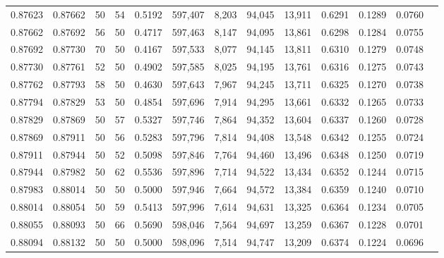 \begin{tabular}{rrrrrrrrrrrrr}
0.87623 & 0.87662 &    50 &  54 &                                     0.5192 & 597,407 &   8,203 &  94,045 &  13,911 & 0.6291 & 0.1289 & 0.0760 \\
0.87662 & 0.87692 &    56 &  50 &                                     0.4717 & 597,463 &   8,147 &  94,095 &  13,861 & 0.6298 & 0.1284 & 0.0755 \\
0.87692 & 0.87730 &    70 &  50 &                                     0.4167 & 597,533 &   8,077 &  94,145 &  13,811 & 0.6310 & 0.1279 & 0.0748 \\
0.87730 & 0.87761 &    52 &  50 &                                     0.4902 & 597,585 &   8,025 &  94,195 &  13,761 & 0.6316 & 0.1275 & 0.0743 \\
0.87762 & 0.87793 &    58 &  50 &                                     0.4630 & 597,643 &   7,967 &  94,245 &  13,711 & 0.6325 & 0.1270 & 0.0738 \\
0.87794 & 0.87829 &    53 &  50 &                                     0.4854 & 597,696 &   7,914 &  94,295 &  13,661 & 0.6332 & 0.1265 & 0.0733 \\
0.87829 & 0.87869 &    50 &  57 &                                     0.5327 & 597,746 &   7,864 &  94,352 &  13,604 & 0.6337 & 0.1260 & 0.0728 \\
0.87869 & 0.87911 &    50 &  56 &                                     0.5283 & 597,796 &   7,814 &  94,408 &  13,548 & 0.6342 & 0.1255 & 0.0724 \\
0.87911 & 0.87944 &    50 &  52 &                                     0.5098 & 597,846 &   7,764 &  94,460 &  13,496 & 0.6348 & 0.1250 & 0.0719 \\
0.87944 & 0.87982 &    50 &  62 &                                     0.5536 & 597,896 &   7,714 &  94,522 &  13,434 & 0.6352 & 0.1244 & 0.0715 \\
0.87983 & 0.88014 &    50 &  50 &                                     0.5000 & 597,946 &   7,664 &  94,572 &  13,384 & 0.6359 & 0.1240 & 0.0710 \\
0.88014 & 0.88054 &    50 &  59 &                                     0.5413 & 597,996 &   7,614 &  94,631 &  13,325 & 0.6364 & 0.1234 & 0.0705 \\
0.88055 & 0.88093 &    50 &  66 &                                     0.5690 & 598,046 &   7,564 &  94,697 &  13,259 & 0.6367 & 0.1228 & 0.0701 \\
0.88094 & 0.88132 &    50 &  50 &                                     0.5000 & 598,096 &   7,514 &  94,747 &  13,209 & 0.6374 & 0.1224 & 0.0696 \\

\end{tabular}
